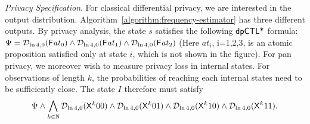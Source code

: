 \noindent
\emph{Privacy Specification}.
For classical differential privacy, we are interested in the output
distribution. Algorithm~\ref{algorithm:frequency-estimator} has three
different outputs. By privacy analysis, the state $s$ satisfies the
following $\textsf{dpCTL*}$ formula:
$
\Psi = \mathcal{D}_{{\ln 4}, {0}} (\mathsf{F} \mathit{at}_0) \wedge \mathcal{D}_{{\ln 4}, {0}} (\mathsf{F}
\mathit{at}_1) \wedge \mathcal{D}_{{\ln 4}, {0}} (\mathsf{F} \mathit{at}_2)
$
(Here 
$\mathit{at}_i$, i=1,2,3, is an atomic proposition satisfied only at state $i$, which is not shown in the figure).
For pan privacy, we moreover wish to measure privacy loss in internal
states. For observations of length $k$, the probabilities of reaching
each internal states need to be sufficiently close. The state $I$
therefore must satisfy
\[
\Psi
\wedge
\bigwedge_{k \in \mathbb{N}}
\mathcal{D}_{{\ln 4}, {0}} (\mathsf{X}^k {00}) \wedge
\mathcal{D}_{{\ln 4}, {0}} (\mathsf{X}^k {01}) \wedge
\mathcal{D}_{{\ln 4}, {0}} (\mathsf{X}^k {10}) \wedge
\mathcal{D}_{{\ln 4}, {0}} (\mathsf{X}^k {11}).
\]
